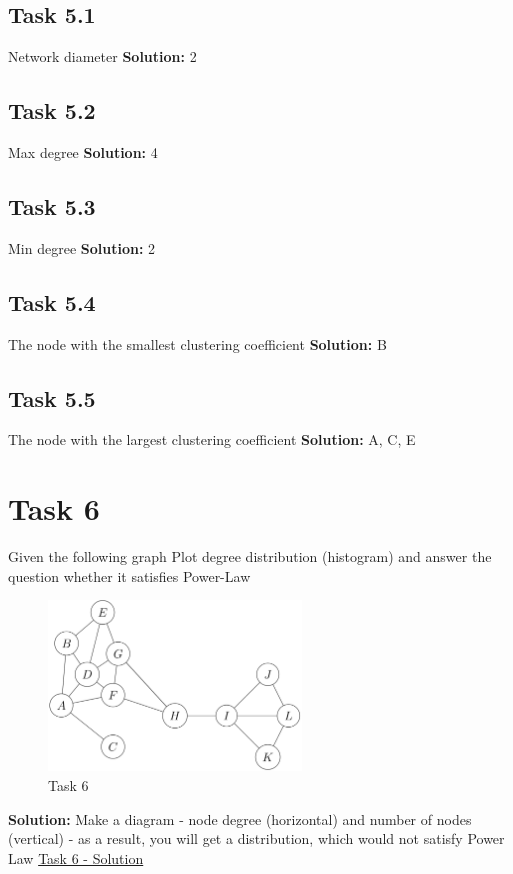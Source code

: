 \documentclass{cernatsnote}
\begin{document}
\subsection{Task 5.1} 
Network diameter
\textbf{Solution:} 2

\subsection{Task 5.2} 
Max degree
\textbf{Solution:} 4

\subsection{Task 5.3} 
Min degree
\textbf{Solution:} 2

\subsection{Task 5.4} 
The node with the smallest clustering coefficient
\textbf{Solution:} B

\subsection{Task 5.5} 
The node with the largest clustering coefficient
\textbf{Solution:} A, C, E
\section{Task 6} 
Given the following graph Plot degree distribution (histogram) and answer the question whether it satisfies Power-Law

\begin{figure}[h]
\centering
\includegraphics[width=0.6\textwidth]{images/task6.png}
\caption{\label{fig:task6} Task 6}
\end{figure}

\textbf{Solution:}  Make a diagram - node degree (horizontal) and number of nodes (vertical) - as a result, you will get a distribution, which would not satisfy Power Law  \href{http://networksciencebook.com/chapter/4#ultra-small}{Task 6 - Solution}
\end{document}
